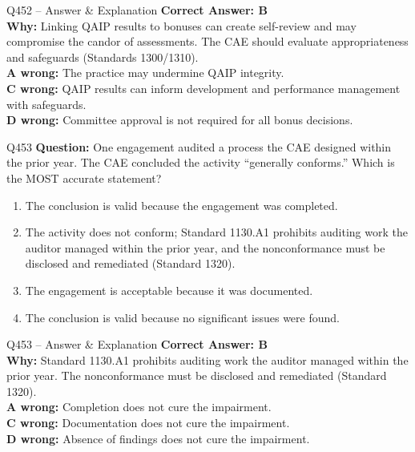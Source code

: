 \documentclass[aspectratio=169,10pt]{beamer}
\begin{document}
	\begin{frame}[t]{Q452 -- Answer \& Explanation}
		\small
		\textbf{Correct Answer: B} \\[4pt]
		\textbf{Why:} Linking QAIP results to bonuses can create self-review and may compromise the candor of assessments. The CAE should evaluate appropriateness and safeguards (Standards 1300/1310). \\[4pt]
		\textbf{A wrong:} The practice may undermine QAIP integrity. \\[2pt]
		\textbf{C wrong:} QAIP results can inform development and performance management with safeguards. \\[2pt]
		\textbf{D wrong:} Committee approval is not required for all bonus decisions.
	\end{frame}
	
	\begin{frame}[t]{Q453}
		\small
		\textbf{Question:} One engagement audited a process the CAE designed within the prior year. The CAE concluded the activity ``generally conforms.'' Which is the MOST accurate statement?
		\begin{enumerate}[label=\Alph*.,itemsep=1pt,topsep=2pt]
			\item The conclusion is valid because the engagement was completed.
			\item The activity does not conform; Standard 1130.A1 prohibits auditing work the auditor managed within the prior year, and the nonconformance must be disclosed and remediated (Standard 1320).
			\item The engagement is acceptable because it was documented.
			\item The conclusion is valid because no significant issues were found.
		\end{enumerate}
	\end{frame}
	
	\begin{frame}[t]{Q453 -- Answer \& Explanation}
		\small
		\textbf{Correct Answer: B} \\[4pt]
		\textbf{Why:} Standard 1130.A1 prohibits auditing work the auditor managed within the prior year. The nonconformance must be disclosed and remediated (Standard 1320). \\[4pt]
		\textbf{A wrong:} Completion does not cure the impairment. \\[2pt]
		\textbf{C wrong:} Documentation does not cure the impairment. \\[2pt]
		\textbf{D wrong:} Absence of findings does not cure the impairment.
	\end{frame}
	
\end{document}
